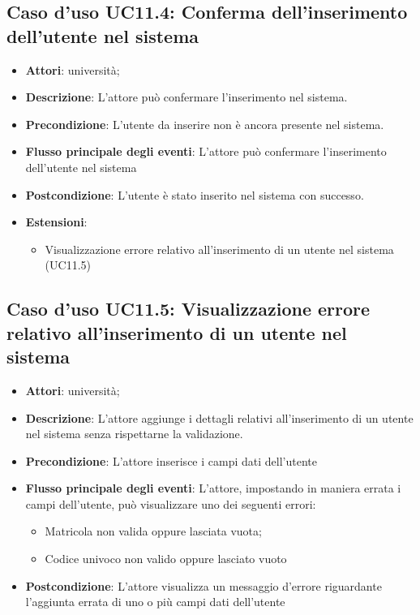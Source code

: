 \subsection{Caso d'uso \texorpdfstring{UC11.4}{UC11.4}: Conferma dell'inserimento dell'utente nel sistema}
\begin{itemize}
\item \textbf{Attori}: università;
\item \textbf{Descrizione}: L'attore può confermare l'inserimento nel sistema.
\item \textbf{Precondizione}: L'utente da inserire non è ancora presente nel sistema.
\item \textbf{Flusso principale degli eventi}: L'attore può confermare l'inserimento dell'utente nel sistema
\item \textbf{Postcondizione}: L'utente è stato inserito nel sistema con successo.
\item \textbf{Estensioni}:
\begin{itemize}
\item Visualizzazione errore relativo all'inserimento di un utente nel sistema (UC11.5)
\end{itemize}
\end{itemize}
\subsection{Caso d'uso \texorpdfstring{UC11.5}{UC11.5}: Visualizzazione errore relativo all'inserimento di un utente nel sistema}
\begin{itemize}
\item \textbf{Attori}: università;
\item \textbf{Descrizione}: L'attore aggiunge i dettagli relativi all'inserimento di un utente nel sistema senza rispettarne la validazione.
\item \textbf{Precondizione}: L'attore inserisce i campi dati dell'utente
\item \textbf{Flusso principale degli eventi}: L'attore, impostando in maniera errata i campi dell'utente, può visualizzare uno dei seguenti errori:
\begin{itemize}
\item Matricola non valida oppure lasciata vuota;
\item Codice univoco non valido oppure lasciato vuoto
\end{itemize}
\item \textbf{Postcondizione}: L'attore visualizza un messaggio d'errore riguardante l'aggiunta errata di uno o più campi dati dell'utente
\end{itemize}
